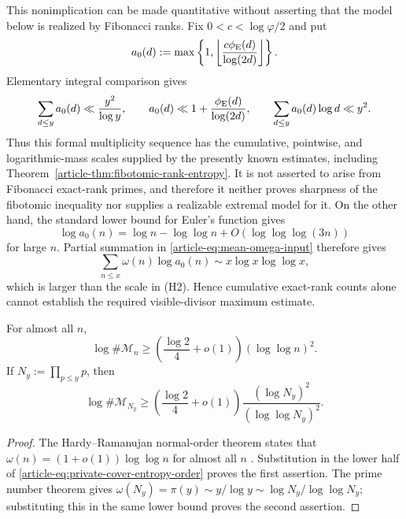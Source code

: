 \begin{remark}
\label{rem:cumulative-rank-estimates-insufficient}
This nonimplication can be made quantitative without asserting that the model
below is realized by Fibonacci ranks. Fix $0<c<\log\varphi/2$ and put
\[
 a_0(d):=\max\left\{1,
 \left\lfloor\frac{c\phi_{\rm E}(d)}{\log(2d)}\right\rfloor\right\}.
\]
Elementary integral comparison gives
\[
 \sum_{d\le y}a_0(d)\ll\frac{y^2}{\log y},\qquad
 a_0(d)\ll1+\frac{\phi_{\rm E}(d)}{\log(2d)},\qquad
 \sum_{d\le y}a_0(d)\log d\ll y^2.
\]
Thus this formal multiplicity sequence has the cumulative, pointwise, and
logarithmic-mass scales supplied by the presently known estimates, including
Theorem~\ref{article-thm:fibotomic-rank-entropy}. It is not asserted to arise from
Fibonacci exact-rank primes, and therefore it neither proves sharpness of the
fibotomic inequality nor supplies a realizable extremal model for it. On the
other hand, the standard
lower bound for Euler's function gives
\[
 \log a_0(n)=\log n-\log\log n+O(\log\log\log(3n))
\]
for large $n$.
Partial summation in \eqref{article-eq:mean-omega-input} therefore gives
\[
 \sum_{n\le x}\omega(n)\log a_0(n)
 \sim x\log x\log\log x,
\]
which is larger than the scale in \textup{(H2)}. Hence cumulative exact-rank
counts alone cannot establish the required visible-divisor maximum estimate.
\end{remark}

\begin{corollary}
\label{cor:unconditional-lower-growth}
For almost all $n$,
\[
 \log\#\mathcal M_n\ge
 \left(\frac{\log2}{4}+o(1)\right)(\log\log n)^2.
\]
If $N_y:=\prod_{p\le y}p$, then
\[
 \log\#\mathcal M_{N_y}\ge
 \left(\frac{\log2}{4}+o(1)\right)
 \frac{(\log N_y)^2}{(\log\log N_y)^2}.
\]
\end{corollary}

\begin{proof}
The Hardy--Ramanujan normal-order theorem states that
$\omega(n)=(1+o(1))\log\log n$ for almost all $n$
\cite{HardyRamanujan1917NormalPrimeFactors,%
Tenenbaum2015AnalyticProbabilistic}. Substitution in the lower half of
\eqref{article-eq:private-cover-entropy-order} proves the first assertion. The prime
number theorem gives
$\omega(N_y)=\pi(y)\sim y/\log y\sim\log N_y/\log\log N_y$; substituting this
in the same lower bound proves the second assertion.
\end{proof}
